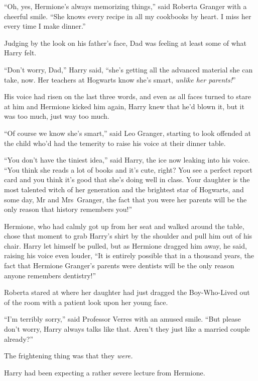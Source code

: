 “Oh, yes, Hermione’s always memorizing things,” said Roberta Granger with a cheerful smile. “She knows every recipe in all my cookbooks by heart. I miss her every time I make dinner.”

Judging by the look on his father’s face, Dad was feeling at least some of what Harry felt.

“Don’t worry, Dad,” Harry said, “she’s getting all the advanced material she can take, now. Her teachers at Hogwarts know she’s smart, \emph{unlike her parents!}”

His voice had risen on the last three words, and even as all faces turned to stare at him and Hermione kicked him again, Harry knew that he’d blown it, but it was too much, just way too much.

“Of course we know she’s smart,” said Leo Granger, starting to look offended at the child who’d had the temerity to raise his voice at their dinner table.

“You don’t have the tiniest idea,” said Harry, the ice now leaking into his voice. “You think she reads a lot of books and it’s cute, right? You see a perfect report card and you think it’s good that she’s doing well in class. Your daughter is the most talented witch of her generation and the brightest star of Hogwarts, and some day, Mr and Mrs~Granger, the fact that you were her parents will be the only reason that history remembers you!”

Hermione, who had calmly got up from her seat and walked around the table, chose that moment to grab Harry’s shirt by the shoulder and pull him out of his chair. Harry let himself be pulled, but as Hermione dragged him away, he said, raising his voice even louder, “It is entirely possible that in a thousand years, the fact that Hermione Granger’s parents were dentists will be the only reason anyone remembers dentistry!”

\later

Roberta stared at where her daughter had just dragged the Boy-Who-Lived out of the room with a patient look upon her young face.

“I’m terribly sorry,” said Professor Verres with an amused smile. “But please don’t worry, Harry always talks like that. Aren’t they just like a married couple already?”

The frightening thing was that they \emph{were.}

\later

Harry had been expecting a rather severe lecture from Hermione.

